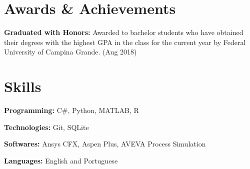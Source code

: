\documentclass[letterpaper,11pt]{article}
\newcommand{\resumeSubHeadingListStart}{\begin{itemize}[leftmargin=0.15in, label={}]}
\newcommand{\resumeSubHeadingListEnd}{\end{itemize}}
\begin{document}

\setlength{\bibhang}{3pt}
{\list
	{}
	{\setlength{\leftmargin}{\bibhang}%
		\setlength{\itemindent}{-\leftmargin}%
		\setlength{\itemsep}{\bibitemsep}%
		\setlength{\parsep}{\bibparsep}}}
{\endlist}
{\item}
\nocite{*}
\printbibliography[env = bibliography, title= Selected Research Publications - Complete list on my {\href{https://scholar.google.com/citations?user=YWvv2bIAAAAJ&hl=en}{\color{blue}Google Scholar.}} ]





\section{Awards \& Achievements}
  \vspace{2pt}
  \resumeSubHeadingListStart
    \small{\item{
        \textbf{Graduated with Honors:}{ Awarded to bachelor students who have obtained their degrees with the highest GPA in the class for the current year by Federal University of Campina Grande. (Aug 2018)} \\ \vspace{3pt}
    }}
  \resumeSubHeadingListEnd


\section{Skills}
  \vspace{2pt}
  \resumeSubHeadingListStart
    \small{\item{
        
        \textbf{Programming:}{ C\#, Python, MATLAB, R} \\ \vspace{3pt}
        
        \textbf{Technologies:}{ Git, SQLite} \\ \vspace{3pt}

        \textbf{Softwares:}{ Ansys CFX, Aspen Plus, AVEVA Process Simulation} \\ \vspace{3pt}

        \textbf{Languages:}{ English and Portuguese} \\ \vspace{3pt}
    }}
  \resumeSubHeadingListEnd  
\end{document}

